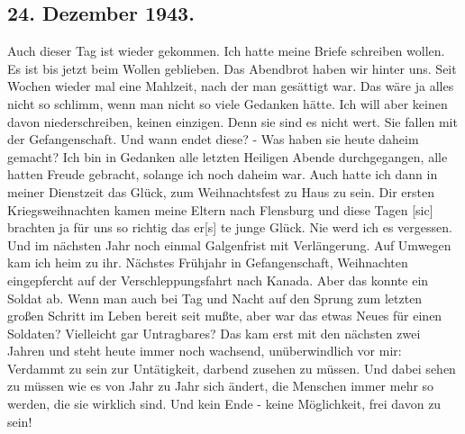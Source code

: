 \subsection{24. Dezember 1943.}

Auch dieser Tag ist wieder gekommen.
Ich hatte meine Briefe schreiben wollen.
Es ist bis jetzt beim Wollen geblieben.
Das Abendbrot haben wir hinter uns.
Seit Wochen wieder mal eine Mahlzeit, nach der man ges\"{a}ttigt war.
Das w\"{a}re ja alles nicht so schlimm, wenn man nicht so viele Gedanken h\"{a}tte.
Ich will aber keinen davon niederschreiben, keinen einzigen.
Denn sie sind es nicht wert.
Sie fallen mit der Gefangenschaft.
Und wann endet diese?
- Was haben sie heute daheim gemacht?
Ich bin in Gedanken alle letzten Heiligen Abende durchgegangen, alle hatten Freude gebracht, solange ich noch daheim war.
Auch hatte ich dann in meiner Dienstzeit das Gl\"{u}ck, zum Weihnachtsfest zu Haus zu sein.
Dir ersten Kriegsweihnachten kamen meine Eltern nach Flensburg und diese Tagen{\color{red} [sic] brachten ja f\"{u}r uns so richtig das er[s] }te junge Gl\"{u}ck.
Nie werd ich es vergessen.
Und im n\"{a}chsten Jahr noch einmal Galgenfrist mit Verl\"{a}ngerung.
Auf Umwegen kam ich heim zu ihr.
N\"{a}chstes Fr\"{u}hjahr in Gefangenschaft, Weihnachten eingepfercht auf der Verschleppungsfahrt nach Kanada.
Aber das konnte ein Soldat ab.
Wenn man auch bei Tag und Nacht auf den Sprung zum letzten gro{\ss}en Schritt im Leben bereit seit mu{\ss}te, aber war das etwas Neues f\"{u}r einen Soldaten?
Vielleicht gar Untragbares?
Das kam erst mit den n\"{a}chsten zwei Jahren und steht heute immer noch wachsend, un\"{u}berwindlich vor mir: Verdammt zu sein zur Unt\"{a}tigkeit, darbend zusehen zu m\"{u}ssen.
Und dabei sehen zu m\"{u}ssen wie es von Jahr zu Jahr sich \"{a}ndert, die Menschen immer mehr so werden, die sie wirklich sind.
Und kein Ende - keine M\"{o}glichkeit, frei davon zu sein!

\clearpage
